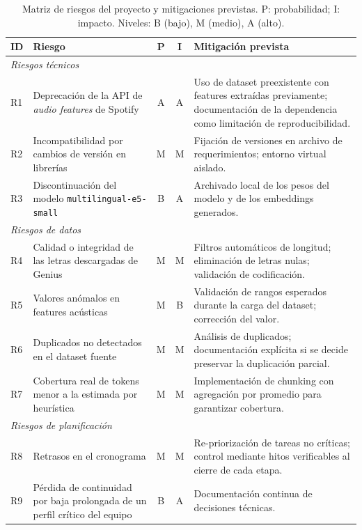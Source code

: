 \begin{table}[H]
\centering
\caption{Matriz de riesgos del proyecto y mitigaciones previstas. P: probabilidad; I: impacto. Niveles: B (bajo), M (medio), A (alto).}
\label{tab:riesgos}
\small
\begin{tabular}{p{0.6cm}p{4.5cm}cc p{6cm}}
\toprule
\textbf{ID} & \textbf{Riesgo} & \textbf{P} & \textbf{I} & \textbf{Mitigación prevista} \\
\midrule
\multicolumn{5}{l}{\textit{Riesgos técnicos}} \\
R1 & Deprecación de la API de \textit{audio features} de Spotify           & A & A & Uso de dataset preexistente con features extraídas previamente; documentación de la dependencia como limitación de reproducibilidad. \\
R2 & Incompatibilidad por cambios de versión en librerías          & M & M & Fijación de versiones en archivo de requerimientos; entorno virtual aislado. \\
R3 & Discontinuación del modelo \texttt{multilingual-}\allowbreak\texttt{e5-}\allowbreak\texttt{small}     & B & A & Archivado local de los pesos del modelo y de los embeddings generados. \\
\midrule
\multicolumn{5}{l}{\textit{Riesgos de datos}} \\
R4 & Calidad o integridad de las letras descargadas de Genius     & M & M & Filtros automáticos de longitud; eliminación de letras nulas; validación de codificación. \\
R5 & Valores anómalos en features acústicas                       & M & B & Validación de rangos esperados durante la carga del dataset; corrección del valor. \\
R6 & Duplicados no detectados en el dataset fuente                & M & M & Análisis de duplicados; documentación explícita si se decide preservar la duplicación parcial. \\
R7 & Cobertura real de tokens menor a la estimada por heurística  & M & M & Implementación de chunking con agregación por promedio para garantizar cobertura. \\
\midrule
\multicolumn{5}{l}{\textit{Riesgos de planificación}} \\
R8 & Retrasos en el cronograma                                    & M & M & Re-priorización de tareas no críticas; control mediante hitos verificables al cierre de cada etapa. \\
R9 & Pérdida de continuidad por baja prolongada de un perfil crítico del equipo          & B & A & Documentación continua de decisiones técnicas. \\
\bottomrule
\end{tabular}
\end{table}

